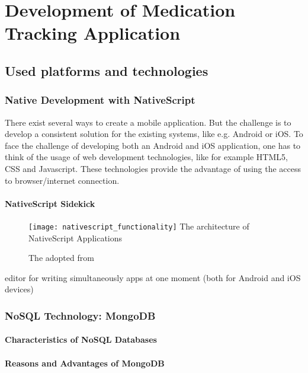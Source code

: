 \chapter{Development of Medication Tracking Application}
\label{Kap3}

\section{Used platforms and technologies}
\subsection{Native Development with NativeScript}

There exist several ways to create a mobile application. But the challenge is to develop a consistent solution for the existing systems, like e.g. Android or iOS.
To face the challenge of developing both an Android and iOS application, one has to think of the usage of web development technologies, like for example HTML5, CSS and Javascript. These technologies provide the advantage of using the access to browser/internet  connection.

\subsubsection{NativeScript Sidekick}

\begin{figure}
\centering
\texttt{[image: nativescript\_functionality]} The architecture of NativeScript Applications
\caption{\label{fig:nsarchitecture}The adopted from \cite{nsarchitecture}} 
\end{figure}



editor for writing simultaneously apps at one moment (both for Android and iOS devices)

\subsection{NoSQL Technology: MongoDB}

\subsubsection{Characteristics of NoSQL Databases}

\subsubsection{Reasons and Advantages of MongoDB}

